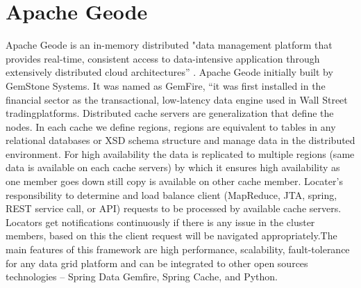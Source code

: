 \section{Apache Geode}

Apache Geode is an in-memory distributed "data management platform that provides real-time, 
consistent access to data-intensive application through extensively distributed cloud 
architectures” \cite{hid-sp18-514-apachegeodewiki}. Apache Geode initially built by GemStone Systems. 
It was named as GemFire, “it was first installed in the financial sector as the transactional, 
low-latency data engine used in Wall Street tradingplatforms.
Distributed cache servers are generalization that define the nodes. In each cache we define regions, 
regions are equivalent to tables in any relational databases or XSD schema structure and manage data in the distributed environment. 
For high availability the data is replicated to multiple regions (same data is available on each cache servers) by which it ensures 
high availability as one member goes down still copy is available on other cache member. Locater’s responsibility to determine 
and load balance client (MapReduce, JTA, spring, REST service call, or API) requests to be processed by available cache servers.
Locators get notifications continuously if there is any issue in the cluster members, based on this the client request will
be navigated appropriately\cite{hid-sp18-514-apachegeodewiki}.The main features of this framework are high performance, 
scalability, fault-tolerance for any data grid platform and can be integrated to other open sources 
technologies – Spring Data Gemfire\cite{hid-sp18-514-geodespringgemfire},
Spring Cache\cite{hid-sp18-514-geodespringcache}, and Python\cite{hid-sp18-514-geodepython}.
